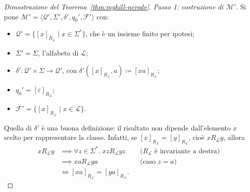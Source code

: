 \documentclass[a4paper, 11pt, oneside]{book}
\theoremstyle{formale}
\begin{document}
\begin{proof}[Dimostrazione del Teorema~\ref{thm:myhill-nerode}]
        \emph{Passo 1: costruzione di $\mathcal{M}'$}. Si pone
        $\mathcal{M}' = \langle \mathcal{Q}', \Sigma', \delta', q_0', \mathcal{F}' \rangle$
        con:
        \begin{itemize}
            \item $\mathcal{Q}' = \{[x]_{R_{\mathcal{L}}} \mid x \in \Sigma^*\}$, che \`e
                un insieme finito per ipotesi;
            \item $\Sigma' = \Sigma$, l'alfabeto di $\mathcal{L}$;
            \item $\delta' \colon \mathcal{Q}' \times \Sigma \to \mathcal{Q}'$, con
                $\delta'([x]_{R_{\mathcal{L}}}, a) \coloneqq [xa]_{R_{\mathcal{L}}}$;
            \item $q_0' = [\varepsilon]_{R_{\mathcal{L}}}$;
            \item $\mathcal{F}' = \{[x]_{R_{\mathcal{L}}} \mid x \in \mathcal{L}\}$.
        \end{itemize}
        Quella di $\delta'$ \`e una buona definizione: il risultato non dipende
        dall'elemento $x$ scelto per rappresentare la classe. Infatti, se
        $[x]_{R_{\mathcal{L}}} = [y]_{R_{\mathcal{L}}}$, cio\`e
        $x \mathrel{R_{\mathcal{L}}} y$, allora
        \begin{align*}
            x \mathrel{R_{\mathcal{L}}} y
                &\implies \forall z \in \Sigma^*.\; xz \mathrel{R_{\mathcal{L}}} yz
                    && \text{($R_{\mathcal{L}}$ \`e invariante a destra)} \\
                &\implies xa \mathrel{R_{\mathcal{L}}} ya
                    && \text{(caso $z = a$)} \\
                &\iff [xa]_{R_{\mathcal{L}}} = [ya]_{R_{\mathcal{L}}}.
        \end{align*}


\end{proof}
\end{document}

